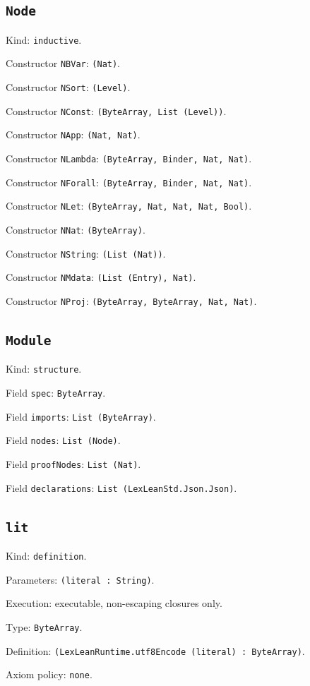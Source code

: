 \documentclass[11pt]{article}
\begin{document}
\subsection*{\texttt{Node}}
\noindent Kind: \texttt{inductive}.\par
\noindent Constructor \texttt{NBVar}: \texttt{(Nat)}.\par
\noindent Constructor \texttt{NSort}: \texttt{(Level)}.\par
\noindent Constructor \texttt{NConst}: \texttt{(ByteArray, List (Level))}.\par
\noindent Constructor \texttt{NApp}: \texttt{(Nat, Nat)}.\par
\noindent Constructor \texttt{NLambda}: \texttt{(ByteArray, Binder, Nat, Nat)}.\par
\noindent Constructor \texttt{NForall}: \texttt{(ByteArray, Binder, Nat, Nat)}.\par
\noindent Constructor \texttt{NLet}: \texttt{(ByteArray, Nat, Nat, Nat, Bool)}.\par
\noindent Constructor \texttt{NNat}: \texttt{(ByteArray)}.\par
\noindent Constructor \texttt{NString}: \texttt{(List (Nat))}.\par
\noindent Constructor \texttt{NMdata}: \texttt{(List (Entry), Nat)}.\par
\noindent Constructor \texttt{NProj}: \texttt{(ByteArray, ByteArray, Nat, Nat)}.\par
\subsection*{\texttt{Module}}
\noindent Kind: \texttt{structure}.\par
\noindent Field \texttt{spec}: \texttt{ByteArray}.\par
\noindent Field \texttt{imports}: \texttt{List (ByteArray)}.\par
\noindent Field \texttt{nodes}: \texttt{List (Node)}.\par
\noindent Field \texttt{proofNodes}: \texttt{List (Nat)}.\par
\noindent Field \texttt{declarations}: \texttt{List (LexLeanStd.Json.Json)}.\par
\subsection*{\texttt{lit}}
\noindent Kind: \texttt{definition}.\par
\noindent Parameters: \texttt{(literal : String)}.\par
\noindent Execution: executable, non-escaping closures only.\par
\noindent Type: \texttt{ByteArray}.\par
\noindent Definition: \texttt{(LexLeanRuntime.utf8Encode (literal) : ByteArray)}.\par
\noindent Axiom policy: \texttt{none}.\par
\end{document}
